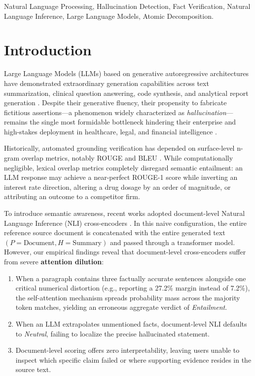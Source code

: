 \documentclass[conference]{IEEEtran}
\begin{document}
\begin{IEEEkeywords}
Natural Language Processing, Hallucination Detection, Fact Verification, Natural Language Inference, Large Language Models, Atomic Decomposition.
\end{IEEEkeywords}

\section{Introduction}
Large Language Models (LLMs) based on generative autoregressive architectures have demonstrated extraordinary generation capabilities across text summarization, clinical question answering, code synthesis, and analytical report generation \cite{brown2020language, touvron2023llama}. Despite their generative fluency, their propensity to fabricate fictitious assertions—a phenomenon widely characterized as \textit{hallucination}—remains the single most formidable bottleneck hindering their enterprise and high-stakes deployment in healthcare, legal, and financial intelligence \cite{ji2023survey}.

Historically, automated grounding verification has depended on surface-level n-gram overlap metrics, notably ROUGE \cite{lin2004rouge} and BLEU \cite{papineni2002bleu}. While computationally negligible, lexical overlap metrics completely disregard semantic entailment: an LLM response may achieve a near-perfect ROUGE-1 score while inverting an interest rate direction, altering a drug dosage by an order of magnitude, or attributing an outcome to a competitor firm. 

To introduce semantic awareness, recent works adopted document-level Natural Language Inference (NLI) cross-encoders \cite{williams2018broad, laurer2022less}. In this naive configuration, the entire reference source document is concatenated with the entire generated text $(P=\text{Document}, H=\text{Summary})$ and passed through a transformer model. However, our empirical findings reveal that document-level cross-encoders suffer from severe \textbf{attention dilution}:
\begin{enumerate}
    \item When a paragraph contains three factually accurate sentences alongside one critical numerical distortion (e.g., reporting a 27.2\% margin instead of 7.2\%), the self-attention mechanism spreads probability mass across the majority token matches, yielding an erroneous aggregate verdict of \textit{Entailment}.
    \item When an LLM extrapolates unmentioned facts, document-level NLI defaults to \textit{Neutral}, failing to localize the precise hallucinated statement.
    \item Document-level scoring offers zero interpretability, leaving users unable to inspect which specific claim failed or where supporting evidence resides in the source text.
\end{enumerate}
\end{document}
